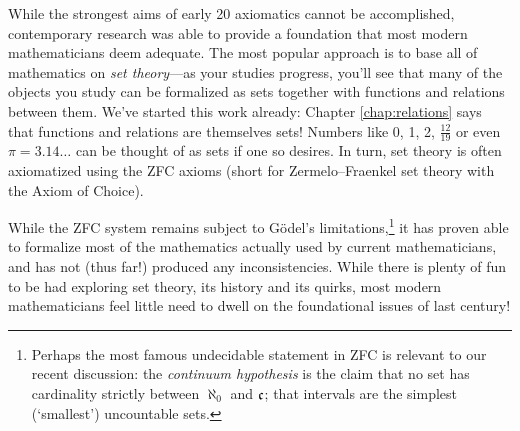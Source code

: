 While the strongest aims of early 20\th{} axiomatics cannot be accomplished, contemporary research was able to provide a foundation that most modern mathematicians deem adequate. The most popular approach is to base all of mathematics on \emph{set theory}---as your studies progress, you'll see that many of the objects you study can be formalized as sets together with functions and relations between them. We've started this work already: Chapter \ref{chap:relations} says that functions and relations are themselves sets! Numbers like 0, 1, 2, $\frac{12}{19}$ or even $\pi=3.14\ldots$ can be thought of as sets if one so desires. In turn, set theory is often axiomatized using the ZFC axioms (short for Zermelo--Fraenkel set theory with the Axiom of Choice).\smallbreak

While the ZFC system remains subject to Gödel's limitations,\footnote{%
	Perhaps the most famous undecidable statement in ZFC is relevant to our recent discussion: the \emph{continuum hypothesis} is the claim that no set has cardinality strictly between $\aleph_0$ and $\mathfrak{c}$; that intervals are the simplest (`smallest') uncountable sets.%
} it has proven able to formalize most of the mathematics actually used by current mathematicians, and has not (thus far!) produced any inconsistencies. While there is plenty of fun to be had exploring set theory, its history and its quirks, most modern mathematicians feel little need to dwell on the foundational issues of last century!


